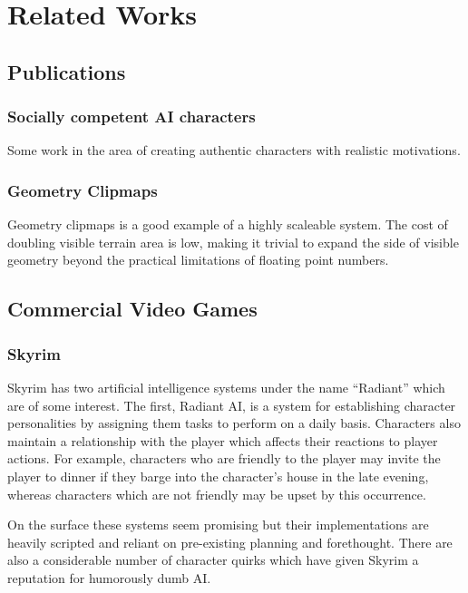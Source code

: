
\chapter{Related Works}

\section{Publications}

\subsection{Socially competent AI characters}

Some work in the area of creating authentic characters with realistic motivations. \cite{socially_competent}

\subsection{Geometry Clipmaps}

Geometry clipmaps is a good example of a highly scaleable system. The cost of doubling visible terrain area is low, making it trivial to expand the side of visible geometry beyond the practical limitations of floating point numbers. \cite{geometry_clipmaps}

\section{Commercial Video Games}

\subsection{Skyrim}

Skyrim has two artificial intelligence systems under the name ``Radiant'' which are of some interest. The first, Radiant AI, is a system for establishing character personalities by assigning them tasks to perform on a daily basis. Characters also maintain a relationship with the player which affects their reactions to player actions. For example, characters who are friendly to the
player may invite the player to dinner if they barge into the character's house in the late evening, whereas characters which are not friendly may be upset by this occurrence.

On the surface these systems seem promising but their implementations are heavily scripted and reliant on pre-existing planning and forethought. There are also a considerable number of character quirks which have given Skyrim a reputation for humorously dumb AI. \cite{skyrim_gamespy} \cite{skyrim_ign} \cite{gameinformer_skyrimtech} \cite{skyrim_nesmith_radiant} \cite{skyrim_whatsnew}

